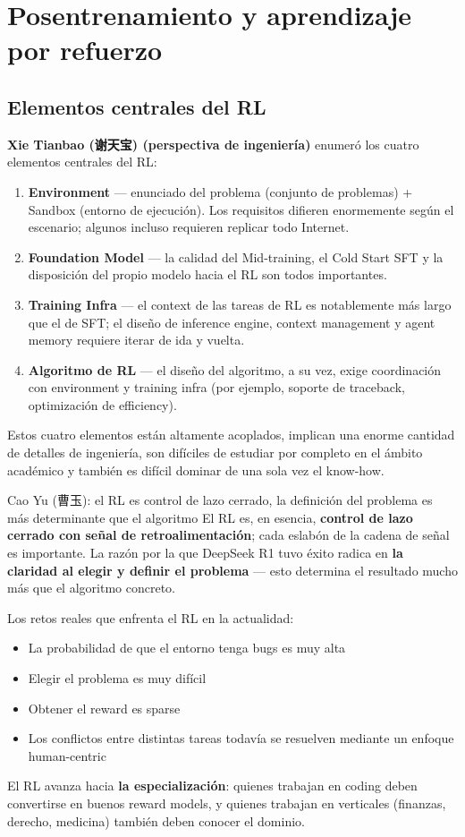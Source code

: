\section{Posentrenamiento y aprendizaje por refuerzo}

\subsection{Elementos centrales del RL}

\textbf{Xie Tianbao (谢天宝) (perspectiva de ingeniería)} enumeró los cuatro elementos centrales del RL:
\begin{enumerate}
  \item \textbf{Environment} — enunciado del problema (conjunto de problemas) + Sandbox (entorno de ejecución). Los requisitos difieren enormemente según el escenario; algunos incluso requieren replicar todo Internet.
  \item \textbf{Foundation Model} — la calidad del Mid-training, el Cold Start SFT y la disposición del propio modelo hacia el RL son todos importantes.
  \item \textbf{Training Infra} — el context de las tareas de RL es notablemente más largo que el de SFT; el diseño de inference engine, context management y agent memory requiere iterar de ida y vuelta.
  \item \textbf{Algoritmo de RL} — el diseño del algoritmo, a su vez, exige coordinación con environment y training infra (por ejemplo, soporte de traceback, optimización de efficiency).
\end{enumerate}
Estos cuatro elementos están altamente acoplados, implican una enorme cantidad de detalles de ingeniería, son difíciles de estudiar por completo en el ámbito académico y también es difícil dominar de una sola vez el know-how.

\begin{importantbox}{Cao Yu (曹玉): el RL es control de lazo cerrado, la definición del problema es más determinante que el algoritmo}
El RL es, en esencia, \textbf{control de lazo cerrado con señal de retroalimentación}; cada eslabón de la cadena de señal es importante. La razón por la que DeepSeek R1 tuvo éxito radica en \textbf{la claridad al elegir y definir el problema} — esto determina el resultado mucho más que el algoritmo concreto.

Los retos reales que enfrenta el RL en la actualidad:
\begin{itemize}
  \item La probabilidad de que el entorno tenga bugs es muy alta
  \item Elegir el problema es muy difícil
  \item Obtener el reward es sparse
  \item Los conflictos entre distintas tareas todavía se resuelven mediante un enfoque human-centric
\end{itemize}
El RL avanza hacia \textbf{la especialización}: quienes trabajan en coding deben convertirse en buenos reward models, y quienes trabajan en verticales (finanzas, derecho, medicina) también deben conocer el dominio.
\end{importantbox}


